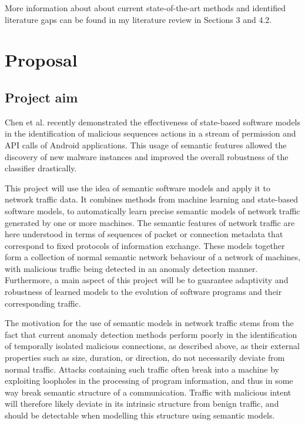 \documentclass[a4paper,12pt,twoside]{report}
\begin{document}
More information about about current state-of-the-art methods and identified literature gaps can be found in my literature review in Sections 3 and 4.2.

\chapter{Proposal}

\section{Project aim}

Chen et al. \cite{chen_2016_robust,chen_more_2016} recently demonstrated the effectiveness of state-based software models in the identification of malicious sequences actions in a stream of permission and API calls of Android applications. This usage of semantic features allowed the discovery of new malware instances and improved the overall robustness of the classifier drastically. 

This project will use the idea of semantic software models and apply it to network traffic data. It combines methods from machine learning and state-based software models, to automatically learn precise semantic models of network traffic generated by one or more machines. The semantic features of network traffic are here understood in terms of sequences of packet or connection metadata that correspond to fixed protocols of information exchange. These models together form a collection of normal semantic network behaviour of a network of machines, with malicious traffic being detected in an anomaly detection manner. Furthermore, a main aspect of this project will be to guarantee adaptivity and robustness of learned models to the evolution of software programs and their corresponding traffic. 

The motivation for the use of semantic models in network traffic stems from the fact that current anomaly detection methods perform poorly in the identification of temporally isolated malicious connections, as described above, as their external properties such as size, duration, or direction, do not necessarily deviate from normal traffic. Attacks containing such traffic often break into a machine by exploiting loopholes in the processing of program information, and thus in some way  break semantic structure of a communication. Traffic with malicious intent will therefore likely deviate in its intrinsic structure from benign traffic, and should be detectable when modelling this structure using semantic models.
\end{document}
